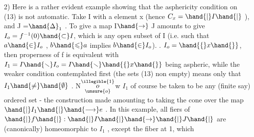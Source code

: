 2)  Here is a rather evident example showing that the asphericity
condition on (13) is not automatic.  Take  I  with a   element x
(hence  $C_{x} = \hand{|}I\hand{|}$ ),  and J =$\hand{\Delta}_{1}$  .  To give
a map  I$\hand{\rightarrow}$ J  amounts to give  $I_{o} = f^{-1}(0) \hand{\subset} I$,  which is any open subset
of I (i.e. such that $a \hand{\in} I_{o}$ ,  $b \hand{\leqslant} a$  implies $b \hand{\in} I_{o}$).   
.  $I_{o} = \hand{\{}x\hand{\}}$,  then properness of
f is equivalent with  $I_{1} = I \hand{\smallsetminus} I_{o} = I\hand{\smallsetminus}\hand{\{}x\hand{\}}$ being aspheric,  while the
weaker condition contemplated first (the sets (13) non empty) means only
that $I_{1} \hand{\neq} \hand{\emptyset}$ .  N$\overset{\illegible{1}}{\underset{\unsure{o}}{o}}$w $I_{1}$   of course be taken to be any (finite say)
ordered set - the construction made amounting to taking the cone over
the map $\hand{|}I_{1}\hand{|} \hand{\longrightarrow} e$ .   In this example,  all fiers of $\hand{|}f\hand{|} :\hand{|}I\hand{|}\hand{\rightarrow}\hand{|}J\hand{|}$
are (canonically) homeomorphic to  $I_{1}$  , except the fiber at  1, which


